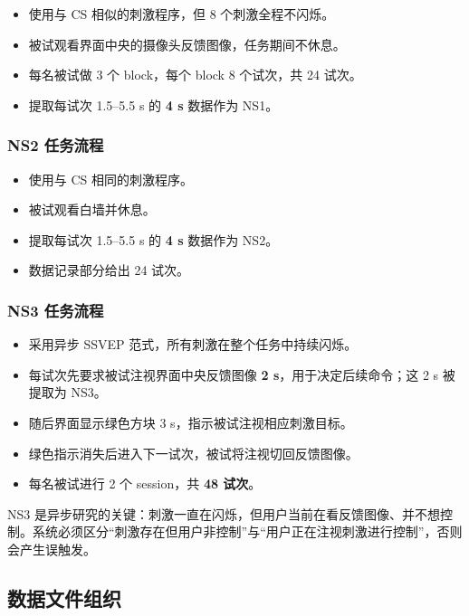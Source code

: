 \documentclass[12pt, a4paper]{ctexart}
\begin{document}
\begin{itemize}
  \item 使用与 CS 相似的刺激程序，但 8 个刺激全程不闪烁。
  \item 被试观看界面中央的摄像头反馈图像，任务期间不休息。
  \item 每名被试做 3 个 block，每个 block 8 个试次，共 24 试次。
  \item 提取每试次 1.5--5.5 s 的 \textbf{4 s} 数据作为 NS1。
\end{itemize}

\subsubsection*{NS2 任务流程}

\begin{itemize}
  \item 使用与 CS 相同的刺激程序。
  \item 被试观看白墙并休息。
  \item 提取每试次 1.5--5.5 s 的 \textbf{4 s} 数据作为 NS2。
  \item 数据记录部分给出 24 试次。
\end{itemize}

\subsubsection*{NS3 任务流程}

\begin{itemize}
  \item 采用异步 SSVEP 范式，所有刺激在整个任务中持续闪烁。
  \item 每试次先要求被试注视界面中央反馈图像 \textbf{2 s}，用于决定后续命令；这 2 s 被提取为 NS3。
  \item 随后界面显示绿色方块 3 s，指示被试注视相应刺激目标。
  \item 绿色指示消失后进入下一试次，被试将注视切回反馈图像。
  \item 每名被试进行 2 个 session，共 \textbf{48 试次}。
\end{itemize}

NS3 是异步研究的关键：刺激一直在闪烁，但用户当前在看反馈图像、并不想控制。系统必须区分``刺激存在但用户非控制''与``用户正在注视刺激进行控制''，否则会产生误触发。

\subsection{数据文件组织}
\end{document}
